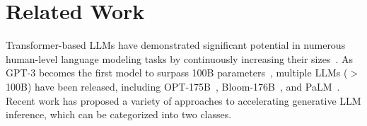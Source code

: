 \section{Related Work}
\label{sec:related}

Transformer-based LLMs have demonstrated significant potential in numerous human-level language modeling tasks by continuously increasing their sizes~\cite{vaswani2017attention, rae2021scaling, smith2022using, du2022glam, chowdhery2022palm}.
As GPT-3 becomes the first model to surpass 100B parameters~\cite{brown2020language}, multiple LLMs ($>$100B) have been released, including OPT-175B~\cite{zhang2022opt}, Bloom-176B~\cite{scao2022bloom}, and PaLM~\cite{chowdhery2022palm}.
Recent work has proposed a variety of approaches to accelerating generative LLM inference, which can be categorized into two classes.

